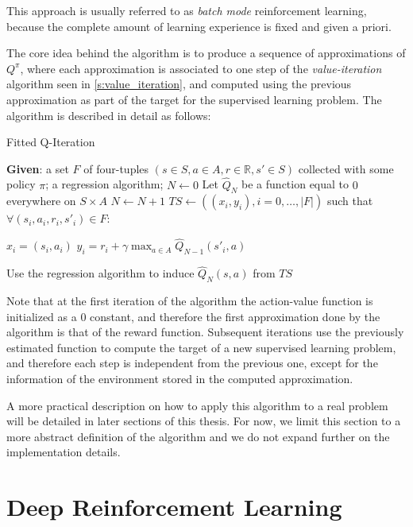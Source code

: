 This approach is usually referred to as \textit{batch mode} reinforcement 
learning, because the complete amount of learning experience is fixed and given
a priori.

The core idea behind the algorithm is to produce a sequence of approximations of
$Q^\pi$, where each approximation is associated to one step of the \textit{value-iteration}
algorithm seen in \ref{s:value_iteration}, and computed using the previous 
approximation as part of the target for the supervised learning problem. The 
algorithm is described in detail	 as follows:
%
\begin{algorithm}[H]
    \caption{Fitted Q-Iteration}
    \begin{algorithmic}
        \STATE \textbf{Given}: a set $F$ of four-tuples $(s \in S, a \in A, r \in \mathbb{R}, s' \in S)$ collected with some policy $\pi$; a regression algorithm;
        \STATE $N \leftarrow 0$
        \STATE Let $\hat{Q}_N$ be a function equal to $0$ everywhere on $S \times A$
        \REPEAT
	    \STATE $N \leftarrow N+1$
	    \STATE $TS \leftarrow ((x_i, y_i), i = 0, \dots, |F|)$ such that $\forall (s_i, a_i, r_i, s'_i) \in F$:
		\begin{ALC@g}
		\STATE $x_i = (s_i, a_i)$
		\STATE $y_i = r_i + \gamma \max_{a \in A} \hat{Q}_{N-1} (s'_i, a)$
		\end{ALC@g}
	    \STATE Use the regression algorithm to induce $\hat{Q}_N(s, a)$ from $TS$
    \end{algorithmic}
\end{algorithm}
%

Note that at the first iteration of the algorithm the action-value function is
initialized as a $0$ constant, and therefore the first approximation done by the 
algorithm is that of the reward function.
Subsequent iterations use the previously estimated function to compute the target
of a new supervised learning problem, and therefore each step is independent from
the previous one, except for the information of the environment stored in the 
computed approximation. 

A more practical description on how to apply this algorithm to a real problem
will be detailed in later sections of this thesis. For now, we limit this section 
to a more abstract definition of the algorithm and we do not expand further
on the implementation details. 

\section{Deep Reinforcement Learning} \label{s:DRL}





